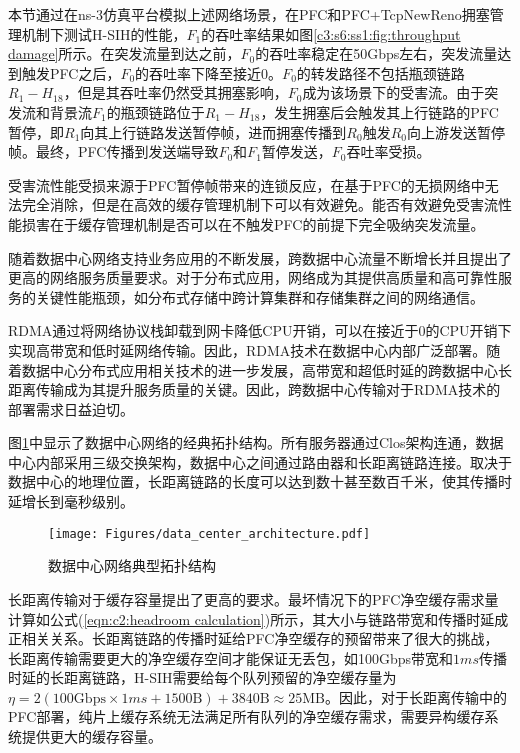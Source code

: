 本节通过在ns-3仿真平台模拟上述网络场景，在PFC和PFC+TcpNewReno拥塞管理机制下测试H-SIH的性能，$F_1$的吞吐率结果如图\ref{c3:s6:ss1:fig:throughput damage}所示。在突发流量到达之前，$F_0$的吞吐率稳定在50Gbps左右，突发流量达到触发PFC之后，$F_0$的吞吐率下降至接近0。$F_0$的转发路径不包括瓶颈链路$R_1-H_{18}$，但是其吞吐率仍然受其拥塞影响，$F_0$成为该场景下的受害流。由于突发流和背景流$F_1$的瓶颈链路位于$R_1-H_{18}$，发生拥塞后会触发其上行链路的PFC暂停，即$R_1$向其上行链路发送暂停帧，进而拥塞传播到$R_0$触发$R_0$向上游发送暂停帧。最终，PFC传播到发送端导致$F_0$和$F_1$暂停发送，$F_0$吞吐率受损。

受害流性能受损来源于PFC暂停帧带来的连锁反应，在基于PFC的无损网络中无法完全消除，但是在高效的缓存管理机制下可以有效避免。能否有效避免受害流性能损害在于缓存管理机制是否可以在不触发PFC的前提下完全吸纳突发流量。



随着数据中心网络支持业务应用的不断发展，跨数据中心流量不断增长并且提出了更高的网络服务质量要求\cite{zhao2023deterministic}。对于分布式应用，网络成为其提供高质量和高可靠性服务的关键性能瓶颈，如分布式存储中跨计算集群和存储集群之间的网络通信。

RDMA通过将网络协议栈卸载到网卡降低CPU开销，可以在接近于0的CPU开销下实现高带宽和低时延网络传输。因此，RDMA技术在数据中心内部广泛部署。随着数据中心分布式应用相关技术的进一步发展，高带宽和超低时延的跨数据中心长距离传输成为其提升服务质量的关键。因此，跨数据中心传输对于RDMA技术的部署需求日益迫切。

图\ref{c4:s1:ss1:fig:data center typical topology}中显示了数据中心网络的经典拓扑结构。所有服务器通过Clos架构连通，数据中心内部采用三级交换架构，数据中心之间通过路由器和长距离链路连接。取决于数据中心的地理位置，长距离链路的长度可以达到数十甚至数百千米，使其传播时延增长到毫秒级别\cite{bai2023empowering}。

\begin{figure}[H]
  \centering
  \texttt{[image: Figures/data\_center\_architecture.pdf]}
  \caption{数据中心网络典型拓扑结构}
  \label{c4:s1:ss1:fig:data center typical topology}
\end{figure}

长距离传输对于缓存容量提出了更高的要求。最坏情况下的PFC净空缓存需求量计算如公式(\ref{eqn:c2:headroom calculation})所示，其大小与链路带宽和传播时延成正相关关系。长距离链路的传播时延给PFC净空缓存的预留带来了很大的挑战，长距离传输需要更大的净空缓存空间才能保证无丢包，如100Gbps带宽和$1ms$传播时延的长距离链路，H-SIH需要给每个队列预留的净空缓存量为$\eta=2(100\text{Gbps} \times 1ms + 1500\text{B})+\text{3840B}\approx 25\text{MB}$。因此，对于长距离传输中的PFC部署，纯片上缓存系统无法满足所有队列的净空缓存需求，需要异构缓存系统提供更大的缓存容量。

